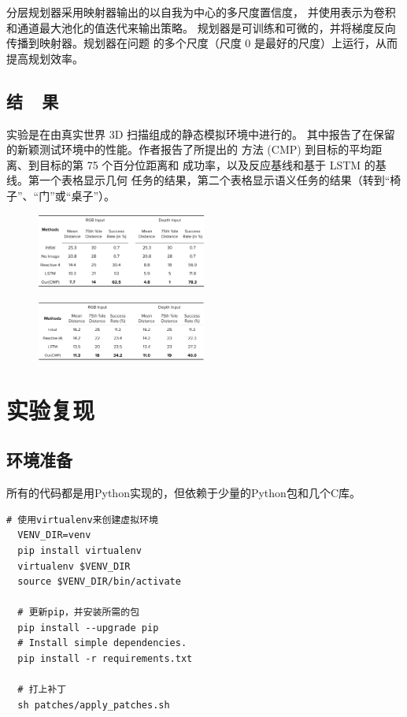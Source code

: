 \documentclass{thuemp}
\begin{document}
分层规划器采用映射器输出的以自我为中心的多尺度置信度，
并使用表示为卷积和通道最大池化的值迭代来输出策略。
规划器是可训练和可微的，并将梯度反向传播到映射器。规划器在问题
的多个尺度（尺度 0 是最好的尺度）上运行，从而提高规划效率。
\subsection{结~~果}
实验是在由真实世界 3D 扫描组成的静态模拟环境中进行的。
其中报告了在保留的新颖测试环境中的性能。作者报告了所提出的
方法 (CMP) 到目标的平均距离、到目标的第 75 个百分位距离和
成功率，以及反应基线和基于 LSTM 的基线。第一个表格显示几何
任务的结果，第二个表格显示语义任务的结果（转到“椅子”、“门”或“桌子”）。
\begin{figure}[h]
\centering
\includegraphics[width=0.5\textwidth]{image/4.png}
\end{figure}
\begin{figure}[h]
  \centering
  \includegraphics[width=0.5\textwidth]{image/5.png}
  \end{figure}
\section{实验复现}
\subsection{环境准备}
所有的代码都是用Python实现的，但依赖于少量的Python包和几个C库。
\begin{lstlisting}[style = Python]
  # 使用virtualenv来创建虚拟环境
  VENV_DIR=venv
  pip install virtualenv
  virtualenv $VENV_DIR
  source $VENV_DIR/bin/activate
  
  # 更新pip，并安装所需的包
  pip install --upgrade pip
  # Install simple dependencies.
  pip install -r requirements.txt

  # 打上补丁
  sh patches/apply_patches.sh
\end{lstlisting}
\end{document}
